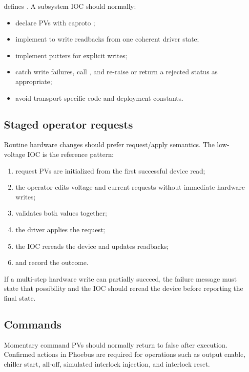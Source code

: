  defines . A subsystem IOC should normally:

\begin{itemize}
  \item declare PVs with caproto ;
  \item implement  to write readbacks from one coherent driver state;
  \item implement putters for explicit writes;
  \item catch write failures, call , and re-raise or return a rejected status as appropriate;
  \item avoid transport-specific code and deployment constants.
\end{itemize}

\subsection{Staged operator requests}

Routine hardware changes should prefer request/apply semantics. The low-voltage IOC is the reference pattern:

\begin{enumerate}
  \item request PVs are initialized from the first successful device read;
  \item the operator edits voltage and current requests without immediate hardware writes;
  \item {} validates both values together;
  \item the driver applies the request;
  \item the IOC rereads the device and updates readbacks;
  \item {} and  record the outcome.
\end{enumerate}

If a multi-step hardware write can partially succeed, the failure message must state that possibility and the IOC should reread the device before reporting the final state.

\subsection{Commands}

Momentary command PVs should normally return to false after execution. Confirmed actions in Phoebus are required for operations such as output enable, chiller start, all-off, simulated interlock injection, and interlock reset.

